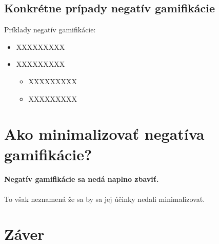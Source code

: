 \documentclass[10pt,oneside,slovak,a4paper]{article}
\begin{document}
\subsection{Konkrétne prípady negatív gamifikácie} \label{NegativnePriklady}

Príklady negatív gamifikácie:

\begin{itemize}
\item XXXXXXXXX
\item XXXXXXXXX
	\begin{itemize}
	\item XXXXXXXXX
	\item XXXXXXXXX
	\end{itemize}
\end{itemize}


\section{Ako minimalizovať negatíva gamifikácie?} \label{MinimalizovanieNegatGamif}

\paragraph{Negatív gamifikácie sa nedá naplno zbaviť.}
To však neznamená že sa by sa jej účinky nedali minimalizovať.


\section{Záver} \label{Zaver} %






\end{document}
